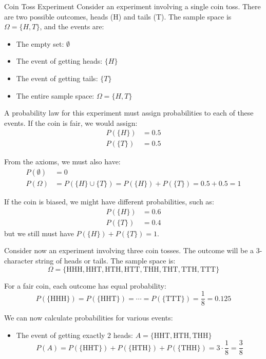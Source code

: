 \begin{exampleboxbreak}{Coin Toss Experiment}
Consider an experiment involving a single coin toss. There are two possible outcomes, heads (H) and tails (T). The sample space is $\Omega = \{H, T\}$, and the events are:
\begin{itemize}
    \item The empty set: $\emptyset$
    \item The event of getting heads: $\{H\}$
    \item The event of getting tails: $\{T\}$
    \item The entire sample space: $\Omega = \{H, T\}$
\end{itemize}

A probability law for this experiment must assign probabilities to each of these events. If the coin is fair, we would assign:
\begin{align}
P(\{H\}) &= 0.5\\
P(\{T\}) &= 0.5
\end{align}

From the axioms, we must also have:
\begin{align}
P(\emptyset) &= 0\\
P(\Omega) &= P(\{H\} \cup \{T\}) = P(\{H\}) + P(\{T\}) = 0.5 + 0.5 = 1
\end{align}

If the coin is biased, we might have different probabilities, such as:
\begin{align}
P(\{H\}) &= 0.6\\
P(\{T\}) &= 0.4
\end{align}
but we still must have $P(\{H\}) + P(\{T\}) = 1$. 


Consider now an experiment involving three coin tosses. The outcome will be a 3-character string of heads or tails. The sample space is:
\[\Omega = \{\text{HHH}, \text{HHT}, \text{HTH}, \text{HTT}, \text{THH}, \text{THT}, \text{TTH}, \text{TTT}\}\]

For a fair coin, each outcome has equal probability:
\[P(\{\text{HHH}\}) = P(\{\text{HHT}\}) = \cdots = P(\{\text{TTT}\}) = \frac{1}{8} = 0.125\]

We can now calculate probabilities for various events:
\begin{itemize}
    \item The event of getting exactly 2 heads: $A = \{\text{HHT}, \text{HTH}, \text{THH}\}$
    \[P(A) = P(\{\text{HHT}\}) + P(\{\text{HTH}\}) + P(\{\text{THH}\}) = 3 \cdot \frac{1}{8} = \frac{3}{8}\]
    

\end{itemize}
\end{exampleboxbreak}
